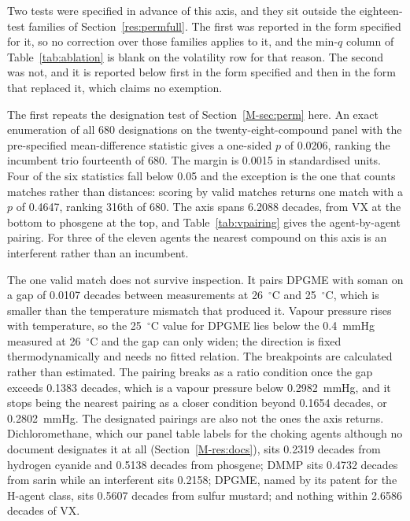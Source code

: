 \documentclass[11pt,a4paper]{article}
\begin{document}
\begin{table}[htb]
  \centering
  \caption{Adopted vapour pressures for the twenty-eight-compound panel, in
  descending order. Tier records how the value was obtained; blank temperature
  means 25~$^{\circ}$C. Sources, rejected candidates and the adjudication where
  sources disagree are deposited in \texttt{outputs/volatility\_space.json}.}
  \label{tab:volatility}
  \small

\end{table}

Two tests were specified in advance of this axis, and they sit outside the
eighteen-test families of Section~\ref{res:permfull}. The first was reported in
the form specified for it, so no correction over those families applies to it,
and the min-$q$ column of Table~\ref{tab:ablation} is blank on the volatility
row for that reason. The second was not, and it is reported below first in the
form specified and then in the form that replaced it, which claims no
exemption.

The first repeats the designation test of Section~\ref{M-sec:perm} here. An
exact enumeration of all 680 designations on the twenty-eight-compound panel
with the pre-specified mean-difference statistic gives a one-sided $p$ of
0.0206, ranking the incumbent trio fourteenth of 680. The margin is 0.0015 in
standardised units. Four of the six statistics fall below 0.05 and the exception
is the one that counts matches rather than distances: scoring by valid matches
returns one match with a $p$ of 0.4647, ranking 316th of 680. The axis spans
6.2088 decades, from VX at the bottom to phosgene at the top, and
Table~\ref{tab:vpairing} gives the agent-by-agent pairing. For three of the
eleven agents the nearest compound on this axis is an interferent rather than an
incumbent.

The one valid match does not survive inspection. It pairs DPGME with soman on a
gap of 0.0107 decades between measurements at 26~$^{\circ}$C and
25~$^{\circ}$C, which is smaller than the temperature mismatch that produced it.
Vapour pressure rises with temperature, so the 25~$^{\circ}$C value for DPGME
lies below the 0.4~mmHg measured at 26~$^{\circ}$C and the gap can only widen;
the direction is fixed thermodynamically and needs no fitted relation. The
breakpoints are calculated rather than estimated. The pairing breaks as a ratio
condition once the gap exceeds 0.1383 decades, which is a vapour pressure below
0.2982~mmHg, and it stops being the nearest pairing as a closer condition beyond
0.1654 decades, or 0.2802~mmHg. The designated pairings are also not the ones
the axis returns. Dichloromethane, which our panel table labels for the choking
agents although no document designates it at all (Section~\ref{M-res:docs}),
sits 0.2319 decades
from hydrogen cyanide and 0.5138 decades from phosgene; DMMP sits
0.4732 decades from sarin while an interferent sits 0.2158; DPGME, named by its
patent for the H-agent class, sits 0.5607 decades from sulfur
mustard; and nothing within 2.6586 decades of VX.
\end{document}
